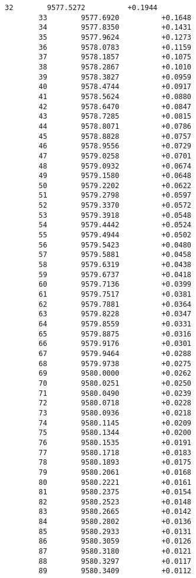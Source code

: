 \documentclass[11pt]{article}
\begin{document}
\begin{Verbatim}[commandchars=\\\{\}]
        32        9577.5272          +0.1944
        33        9577.6920          +0.1648
        34        9577.8350          +0.1431
        35        9577.9624          +0.1273
        36        9578.0783          +0.1159
        37        9578.1857          +0.1075
        38        9578.2867          +0.1010
        39        9578.3827          +0.0959
        40        9578.4744          +0.0917
        41        9578.5624          +0.0880
        42        9578.6470          +0.0847
        43        9578.7285          +0.0815
        44        9578.8071          +0.0786
        45        9578.8828          +0.0757
        46        9578.9556          +0.0729
        47        9579.0258          +0.0701
        48        9579.0932          +0.0674
        49        9579.1580          +0.0648
        50        9579.2202          +0.0622
        51        9579.2798          +0.0597
        52        9579.3370          +0.0572
        53        9579.3918          +0.0548
        54        9579.4442          +0.0524
        55        9579.4944          +0.0502
        56        9579.5423          +0.0480
        57        9579.5881          +0.0458
        58        9579.6319          +0.0438
        59        9579.6737          +0.0418
        60        9579.7136          +0.0399
        61        9579.7517          +0.0381
        62        9579.7881          +0.0364
        63        9579.8228          +0.0347
        64        9579.8559          +0.0331
        65        9579.8875          +0.0316
        66        9579.9176          +0.0301
        67        9579.9464          +0.0288
        68        9579.9738          +0.0275
        69        9580.0000          +0.0262
        70        9580.0251          +0.0250
        71        9580.0490          +0.0239
        72        9580.0718          +0.0228
        73        9580.0936          +0.0218
        74        9580.1145          +0.0209
        75        9580.1344          +0.0200
        76        9580.1535          +0.0191
        77        9580.1718          +0.0183
        78        9580.1893          +0.0175
        79        9580.2061          +0.0168
        80        9580.2221          +0.0161
        81        9580.2375          +0.0154
        82        9580.2523          +0.0148
        83        9580.2665          +0.0142
        84        9580.2802          +0.0136
        85        9580.2933          +0.0131
        86        9580.3059          +0.0126
        87        9580.3180          +0.0121
        88        9580.3297          +0.0117
        89        9580.3409          +0.0112

\end{Verbatim}
\end{document}
